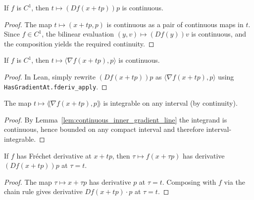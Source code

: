 \begin{lemma}\label{lem:continuous_fderiv_line_apply}
  \leanok{}
  \uses{}
  If $f$ is $C^1$, then $t \mapsto (Df(x+t p))p$ is continuous.
\end{lemma}
\begin{proof}
  \leanok{}
  The map $t\mapsto(x+tp,p)$ is continuous as a pair of continuous maps in $t$. Since $f\in C^1$,
  the bilinear evaluation $(y,v)\mapsto (Df(y))v$ is continuous, and the composition yields
  the required continuity.
\end{proof}

\begin{lemma}\label{lem:continuous_inner_gradient_line}
  \leanok{}
  If $f$ is $C^1$, then $t \mapsto \langle \nabla f(x+t p),p\rangle$ is continuous.
\end{lemma}
\begin{proof}
  \leanok{}
  In Lean, simply rewrite $(Df(x+t p))p$ as $\langle \nabla f(x+t p),p\rangle$ using
  \texttt{HasGradientAt.fderiv\_apply}.
\end{proof}

\begin{lemma}\label{lem:intervalIntegrable_inner_gradient_line}
  \leanok{}
  The map \(t ↦ ⟪∇f(x + t p), p⟫\) is integrable on any interval (by continuity).
\end{lemma}
\begin{proof}
  \leanok{}
  By Lemma~\ref{lem:continuous_inner_gradient_line} the integrand is continuous, hence bounded on
  any compact interval and therefore interval-integrable.
\end{proof}

\begin{lemma}\label{lem:hasDerivAt_comp_line}
  \leanok{}
  \uses{}
  If $f$ has Fr\'echet derivative at $x+t p$, then $\tau\mapsto f(x+\tau p)$ has derivative
  $(Df(x+t p))p$ at $\tau=t$.
\end{lemma}
\begin{proof}
  \leanok{}
  The map $\tau\mapsto x+\tau p$ has derivative $p$ at $\tau=t$. Composing with $f$ via the chain
  rule gives derivative $Df(x+tp)\cdot p$ at $\tau=t$.
\end{proof}

